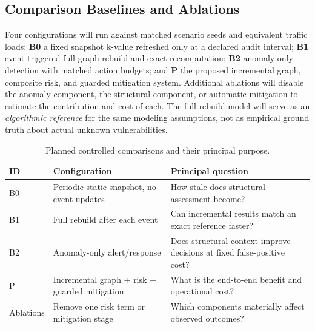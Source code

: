 \documentclass[12pt,a4paper,oneside]{article}
\begin{document}
\subsection{Comparison Baselines and Ablations}
Four configurations will run against matched scenario seeds and equivalent traffic loads: \textbf{B0} a fixed snapshot k-value refreshed only at a declared audit interval; \textbf{B1} event-triggered full-graph rebuild and exact recomputation; \textbf{B2} anomaly-only detection with matched action budgets; and \textbf{P} the proposed incremental graph, composite risk, and guarded mitigation system. Additional ablations will disable the anomaly component, the structural component, or automatic mitigation to estimate the contribution and cost of each. The full-rebuild model will serve as an \emph{algorithmic reference} for the same modeling assumptions, not as empirical ground truth about actual unknown vulnerabilities.

\begin{table}[htbp]
\centering\small
\caption{Planned controlled comparisons and their principal purpose.}\label{tab:baselines}
\begin{tabularx}{\textwidth}{@{}p{17mm}p{49mm}X@{}}
\toprule
\textbf{ID} & \textbf{Configuration} & \textbf{Principal question}\\\midrule
B0 & Periodic static snapshot, no event updates & How stale does structural assessment become?\\
B1 & Full rebuild after each event & Can incremental results match an exact reference faster?\\
B2 & Anomaly-only alert/response & Does structural context improve decisions at fixed false-positive cost?\\
P & Incremental graph + risk + guarded mitigation & What is the end-to-end benefit and operational cost?\\
Ablations & Remove one risk term or mitigation stage & Which components materially affect observed outcomes?\\
\bottomrule
\end{tabularx}
\end{table}
\end{document}
